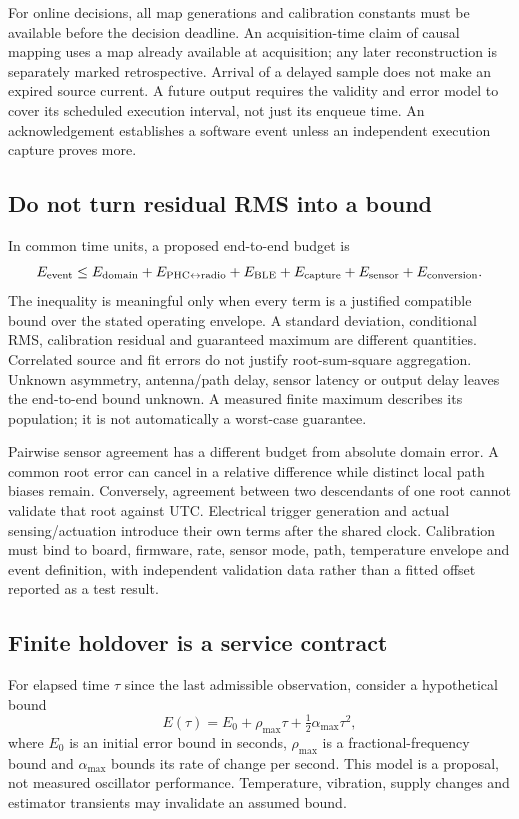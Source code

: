 \documentclass[11pt,letterpaper]{article}
\begin{document}
For online decisions, all map generations and calibration constants must be available before the decision deadline. An acquisition-time claim of causal mapping uses a map already available at acquisition; any later reconstruction is separately marked retrospective. Arrival of a delayed sample does not make an expired source current. A future output requires the validity and error model to cover its scheduled execution interval, not just its enqueue time. An acknowledgement establishes a software event unless an independent execution capture proves more.

\subsection{Do not turn residual RMS into a bound}
In common time units, a proposed end-to-end budget is
\begin{equation}
 E_{\rm event} \leq E_{\rm domain}+E_{\rm PHC\leftrightarrow radio}
 +E_{\rm BLE}+E_{\rm capture}+E_{\rm sensor}+E_{\rm conversion}.
 \label{eq:budget}
\end{equation}
The inequality is meaningful only when every term is a justified compatible bound over the stated operating envelope. A standard deviation, conditional RMS, calibration residual and guaranteed maximum are different quantities. Correlated source and fit errors do not justify root-sum-square aggregation. Unknown asymmetry, antenna/path delay, sensor latency or output delay leaves the end-to-end bound unknown. A measured finite maximum describes its population; it is not automatically a worst-case guarantee.

Pairwise sensor agreement has a different budget from absolute domain error. A common root error can cancel in a relative difference while distinct local path biases remain. Conversely, agreement between two descendants of one root cannot validate that root against UTC. Electrical trigger generation and actual sensing/actuation introduce their own terms after the shared clock. Calibration must bind to board, firmware, rate, sensor mode, path, temperature envelope and event definition, with independent validation data rather than a fitted offset reported as a test result.

\subsection{Finite holdover is a service contract}
For elapsed time $\tau$ since the last admissible observation, consider a hypothetical bound
\begin{equation}
 E(\tau)=E_0+\rho_{\max}\tau+\tfrac12\alpha_{\max}\tau^2,
 \label{eq:holdover}
\end{equation}
where $E_0$ is an initial error bound in seconds, $\rho_{\max}$ is a fractional-frequency bound and $\alpha_{\max}$ bounds its rate of change per second. This model is a proposal, not measured oscillator performance. Temperature, vibration, supply changes and estimator transients may invalidate an assumed bound.
\end{document}
